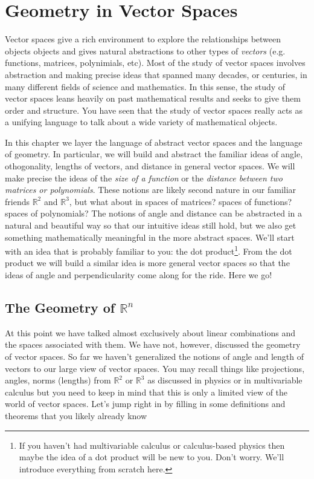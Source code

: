 \chapter{Geometry in Vector Spaces}
Vector spaces give a rich environment to explore the relationships between objects
objects and gives natural abstractions to other types of {\it vectors} (e.g. functions,
matrices, polynimials, etc).  Most of the study of vector spaces involves abstraction
and making precise ideas that spanned many decades, or centuries, in many different fields
of science and mathematics.  In this sense, the study of vector spaces leans heavily on
past mathematical results and seeks to give them order and structure.  You
have seen that the study of vector spaces really acts as a unifying language to talk about
a wide variety of mathematical objects.

In this chapter we layer the language of abstract vector spaces and the language of
geometry.  In particular, we will build and abstract the familiar ideas of angle,
othogonality, lengths of vectors, and distance in general vector spaces.  We will make
precise the ideas of the {\it size of a function} or the {\it distance between two
matrices or polynomials}.  These notions are likely second nature in our familiar friends
$\mathbb{R}^2$ and $\mathbb{R}^3$, but what about in spaces of matrices? spaces of
functions? spaces of polynomials?  The notions of angle and  distance can be abstracted in
a natural and beautiful way so that our intuitive ideas still hold, but we also get
something mathematically meaningful in the more abstract spaces.  We'll start with an idea
that is probably familiar to you: the dot product\footnote{If you haven't had
multivariable calculus or calculus-based physics then maybe the idea of a dot product will
be new to you.  Don't worry.  We'll introduce everything from scratch here.}.  From the
dot product we will build a similar idea is more general vector spaces so that the ideas
of angle and perpendicularity come along for the ride.  Here we go!

\section{The Geometry of $\mathbb{R}^n$}
At this point we have talked almost exclusively about linear combinations and the spaces
associated with them.  We have not, however, discussed the geometry of vector spaces.  So
far we haven't generalized the notions of angle and length of vectors to our large view of
vector spaces.  You may recall things like projections, angles, norms (lengths) from
$\mathbb{R}^2$ or $\mathbb{R}^3$ as discussed in physics or in multivariable calculus but
you need to keep in mind that this is only a limited view of the world of vector spaces.
Let's jump right in by filling in some definitions and theorems that you likely already
know

